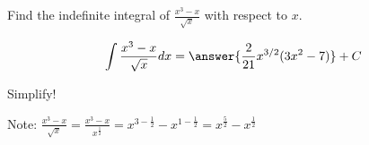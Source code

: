 \documentclass{ximera}
\author{Gregory Hartman \and Matthew Carr\and Nela Lakos}
\begin{document}
\begin{exercise}

Find the indefinite integral of $\frac{x^3-x}{\sqrt{x}}$ with respect to $x$.

\[
\int \frac{x^3-x}{\sqrt{x}} dx=\answer{\frac{2}{21}x^{3/2}(3x^2-7)}+C
\]
\begin{hint}
Simplify! 
\end{hint}
\begin{hint}
Note: $\frac{x^3-x}{\sqrt{x}}=\frac{x^3-x}{x^{\frac{1}{2}}}=x^{3-\frac{1}{2}}-x^{1-\frac{1}{2}}=x^{\frac{5}{2}}-x^{\frac{1}{2}}$
\end{hint}
\end{exercise}
\end{document}
